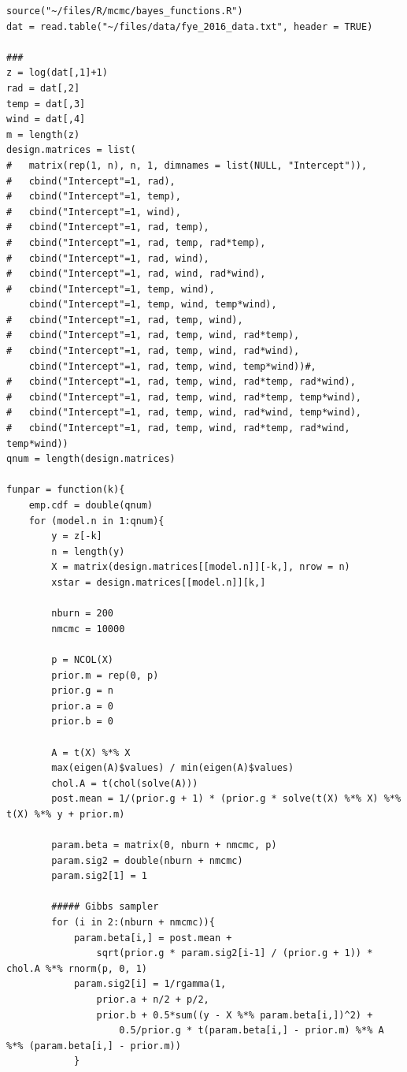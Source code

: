 \documentclass{asaproc}
\begin{document}
\begin{scriptsize}
\begin{verbatim}
source("~/files/R/mcmc/bayes_functions.R")
dat = read.table("~/files/data/fye_2016_data.txt", header = TRUE)

###
z = log(dat[,1]+1)
rad = dat[,2]
temp = dat[,3]
wind = dat[,4]
m = length(z)
design.matrices = list(
#   matrix(rep(1, n), n, 1, dimnames = list(NULL, "Intercept")),
#   cbind("Intercept"=1, rad),
#   cbind("Intercept"=1, temp),
#   cbind("Intercept"=1, wind),
#   cbind("Intercept"=1, rad, temp),
#   cbind("Intercept"=1, rad, temp, rad*temp),
#   cbind("Intercept"=1, rad, wind),
#   cbind("Intercept"=1, rad, wind, rad*wind),
#   cbind("Intercept"=1, temp, wind),
    cbind("Intercept"=1, temp, wind, temp*wind),
#   cbind("Intercept"=1, rad, temp, wind),
#   cbind("Intercept"=1, rad, temp, wind, rad*temp),
#   cbind("Intercept"=1, rad, temp, wind, rad*wind),
    cbind("Intercept"=1, rad, temp, wind, temp*wind))#,
#   cbind("Intercept"=1, rad, temp, wind, rad*temp, rad*wind),
#   cbind("Intercept"=1, rad, temp, wind, rad*temp, temp*wind),
#   cbind("Intercept"=1, rad, temp, wind, rad*wind, temp*wind),
#   cbind("Intercept"=1, rad, temp, wind, rad*temp, rad*wind, temp*wind))
qnum = length(design.matrices)

funpar = function(k){
    emp.cdf = double(qnum)
    for (model.n in 1:qnum){
        y = z[-k]
        n = length(y)
        X = matrix(design.matrices[[model.n]][-k,], nrow = n)
        xstar = design.matrices[[model.n]][k,]

        nburn = 200
        nmcmc = 10000

        p = NCOL(X)
        prior.m = rep(0, p)
        prior.g = n
        prior.a = 0
        prior.b = 0

        A = t(X) %*% X
        max(eigen(A)$values) / min(eigen(A)$values)
        chol.A = t(chol(solve(A)))
        post.mean = 1/(prior.g + 1) * (prior.g * solve(t(X) %*% X) %*% t(X) %*% y + prior.m)

        param.beta = matrix(0, nburn + nmcmc, p)
        param.sig2 = double(nburn + nmcmc)
        param.sig2[1] = 1

        ##### Gibbs sampler
        for (i in 2:(nburn + nmcmc)){
            param.beta[i,] = post.mean +
                sqrt(prior.g * param.sig2[i-1] / (prior.g + 1)) * chol.A %*% rnorm(p, 0, 1)
            param.sig2[i] = 1/rgamma(1,
                prior.a + n/2 + p/2, 
                prior.b + 0.5*sum((y - X %*% param.beta[i,])^2) +
                    0.5/prior.g * t(param.beta[i,] - prior.m) %*% A %*% (param.beta[i,] - prior.m))
            }


\end{verbatim}
\end{scriptsize}
\end{document}
